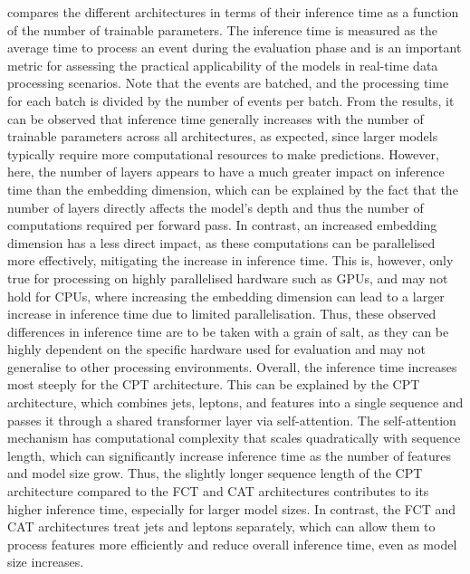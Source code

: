  compares the different architectures in terms of their inference time as a function of the number of trainable parameters. The inference time is measured as the average time to process an event during the evaluation phase and is an important metric for assessing the practical applicability of the models in real-time data processing scenarios. Note that the events are batched, and the processing time for each batch is divided by the number of events per batch.
From the results, it can be observed that inference time generally increases with the number of trainable parameters across all architectures, as expected, since larger models typically require more computational resources to make predictions.
However, here, the number of layers appears to have a much greater impact on inference time than the embedding dimension, which can be explained by the fact that the number of layers directly affects the model's depth and thus the number of computations required per forward pass. In contrast, an increased embedding dimension has a less direct impact, as these computations can be parallelised more effectively, mitigating the increase in inference time. This is, however, only true for processing on highly parallelised hardware such as GPUs, and may not hold for CPUs, where increasing the embedding dimension can lead to a larger increase in inference time due to limited parallelisation. Thus, these observed differences in inference time are to be taken with a grain of salt, as they can be highly dependent on the specific hardware used for evaluation and may not generalise to other processing environments.
Overall, the inference time increases most steeply for the CPT architecture. This can be explained by the CPT architecture, which combines jets, leptons, and \met features into a single sequence and passes it through a shared transformer layer via self-attention. The self-attention mechanism has computational complexity that scales quadratically with sequence length, which can significantly increase inference time as the number of features and model size grow. Thus, the slightly longer sequence length of the CPT architecture compared to the FCT and CAT architectures contributes to its higher inference time, especially for larger model sizes. In contrast, the FCT and CAT architectures treat jets and leptons separately, which can allow them to process features more efficiently and reduce overall inference time, even as model size increases.

